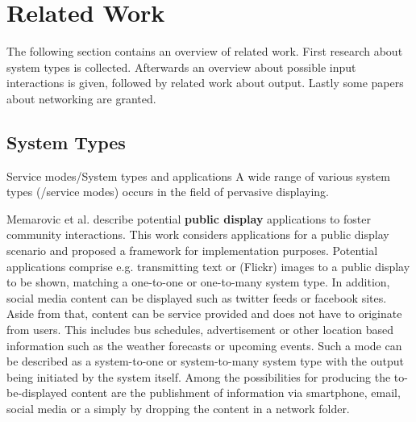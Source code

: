 \section{Related Work}
The following section contains an overview of related work. First research about system types is collected. Afterwards an overview about possible input interactions is given, followed by related work about output. Lastly some papers about networking are granted.

\subsection{System Types}
Service modes/System types and applications
A wide range of various system types (/service modes) occurs in the field of pervasive displaying.

Memarovic et al. \cite{memarovic_places} describe potential \textbf{public display} applications to foster community interactions.
This work considers applications for a public display scenario and proposed a framework for implementation purposes.
Potential applications comprise e.g. transmitting text or (Flickr) images to a public display to be shown, matching a one-to-one or one-to-many system type.
In addition, social media content can be displayed such as twitter feeds or facebook sites.
Aside from that, content can be service provided and does not have to originate from users.
This includes bus schedules, advertisement or other location based information such as the weather forecasts or upcoming events.
Such a mode can be described as a system-to-one or system-to-many system type with the output being initiated by the system itself.
Among the possibilities for producing the to-be-displayed content are the publishment of information via smartphone, email, social media or a simply by dropping the content in a network folder.

